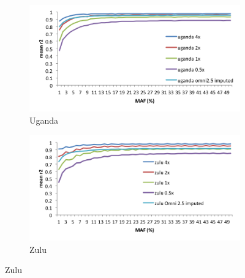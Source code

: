 \begin{figure}
        \centering
        \begin{subfigure}[b]{0.75\textwidth}
                \includegraphics[width=\textwidth]{fig/SN12f5a}
                \caption{Uganda}
                \label{fig:SN12f5uganda}
        \end{subfigure}%

        \begin{subfigure}[b]{0.75\textwidth}
                \includegraphics[width=\textwidth]{fig/SN12f5b}
                \caption{Zulu}
                \label{fig:zulu}
        \end{subfigure}


\end{figure}
